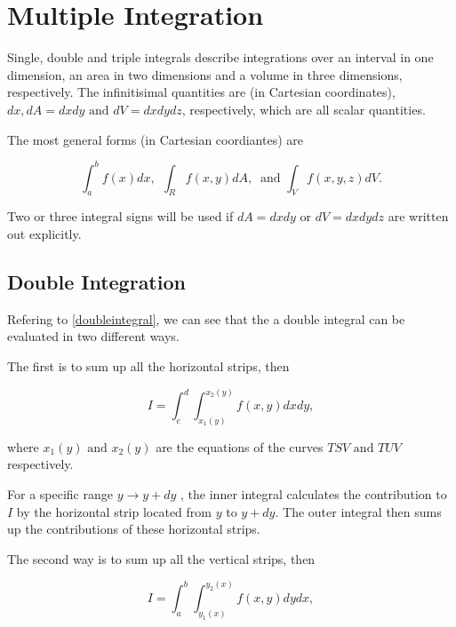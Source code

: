 \documentclass[english,a4paper,12pt]{report}
\begin{document}
\chapter{Multiple Integration}

Single, double and triple integrals describe integrations over an interval in one dimension, an area in two dimensions and a volume in three dimensions, respectively. The infinitisimal quantities are (in Cartesian coordinates), \(dx, dA = dxdy \text { and } dV = dxdydz\), respectively, which are all scalar quantities. 

The most general forms (in Cartesian coordiantes) are 

\begin{equation}
	\int_{a}^{b} f(x) dx, ~~ \int_{R}^{} f(x,y) dA, ~  \text { and } \int_{V}^{} f(x,y,z) dV.   
\end{equation}

Two or three integral signs will be used if \(dA = dxdy \text { or } dV = dxdydz\) are written out explicitly. 

\section{Double Integration}

Refering to \cref{doubleintegral}, we can see that the a double integral can be evaluated in two different ways. 


The first is to sum up all the horizontal strips, then 

\begin{equation}
    I = \int_{c}^{d} \int_{x_1 (y)}^{x_2 (y)} f(x,y) dx dy,   
\end{equation}

where \(x_1 (y) \text { and } x_2 (y)\) are the equations of the curves \(TSV \text { and } TUV\) respectively. 

For a specific range \(y \rightarrow y+dy\) , the inner integral calculates the contribution to \(I\) by the horizontal strip located from \(y\) to \(y+dy\). The outer integral then sums up the contributions of these horizontal strips.

The second way is to sum up all the vertical strips, then

\begin{equation}
    I = \int_{a}^{b} \int_{y_1 (x)}^{y_2 (x)} f(x,y) dy dx,
\end{equation}
\end{document}
